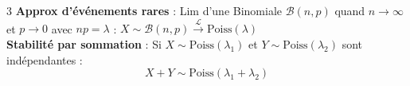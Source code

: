 \documentclass[9pt,a4paper]{article}
\begin{document}
\begin{multicols*}{3}
\textbullet{} \textbf{Approx d'événements rares} : 
Lim d'une Binomiale $\mathcal{B}(n,p)$ quand $n \to \infty$ et $p \to 0$ avec $n p = \lambda$ :
$X \sim \mathcal{B}(n,p) \xrightarrow{\mathcal{L}} \text{Poiss}(\lambda)$\\

\textbullet{} \textbf{Stabilité par sommation} : 
Si $X \sim \text{Poiss}(\lambda_1)$ et $Y \sim \text{Poiss}(\lambda_2)$ sont indépendantes :
$$X + Y \sim \text{Poiss}(\lambda_1 + \lambda_2)$$




\end{multicols*}
\end{document}
